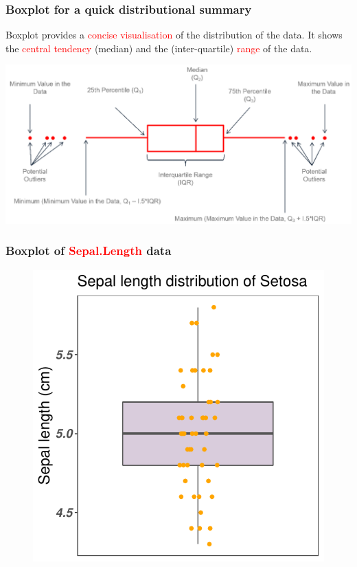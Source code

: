 \documentclass{beamer}
\begin{document}
\begin{frame}\frametitle{Boxplot for a quick distributional summary}
Boxplot provides a \textcolor{red}{concise visualisation} of the distribution of the data. It shows the \textcolor{red}{central tendency} (median) and the (inter-quartile) \textcolor{red}{range} of the data.
\vspace{0.1in}

\includegraphics[width=0.99\linewidth]{PlotsLec1/AnatomyOfBoxplot}
\end{frame}
\begin{frame}\frametitle{Boxplot of \textcolor{red}{Sepal.Length} data}
\begin{figure}
\includegraphics[width=0.70\linewidth]{PlotsLec1/SetosaBoxplot}
\end{figure}
\end{frame}
\end{document}
